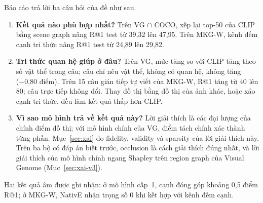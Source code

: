 Báo cáo trả lời ba câu hỏi của đề như sau.
\begin{enumerate}
\item \textbf{Kết quả nào phù hợp nhất?} Trên VG $\cap$ COCO, xếp lại top-50 của CLIP bằng scene graph nâng R@1 test từ
39,32 lên 47,95. Trên MKG-W, kênh đếm cạnh tri thức nâng R@1 test từ 24,89 lên 29,82.
\item \textbf{Tri thức quan hệ giúp ở đâu?} Trên VG, mức tăng so với CLIP tăng theo số vật thể trong câu; câu chỉ nêu vật thể,
không có quan hệ, không tăng (−0,80 điểm). Trên 15 câu gián tiếp tự viết của MKG-W, R@1 tăng từ 40 lên 80; câu trực tiếp không đổi. Thay
đồ thị bằng đồ thị của ảnh khác, hoặc xáo cạnh tri thức, đều làm kết quả thấp hơn CLIP.
\item \textbf{Vì sao mô hình trả về kết quả này?} Lời giải thích là các đại lượng của chính điểm đồ thị; với mô hình chính
của VG, điểm tách chính xác thành từng phần. Mục~\ref{sec:xai} đo fidelity, validity và sparsity của lời giải thích này.
Trên ba bộ có đáp án biết trước, occlusion là cách giải thích đúng nhất, và lời giải thích của mô hình chính
ngang Shapley trên region graph của Visual Genome (Mục~\ref{sec:xai-v3}).
\end{enumerate}
Hai kết quả âm được ghi nhận: ở mô hình cấp~1, cạnh đóng góp khoảng 0,5 điểm R@1; ở MKG-W, NativE nhận trọng số 0 khi kết
hợp với kênh đếm cạnh.
